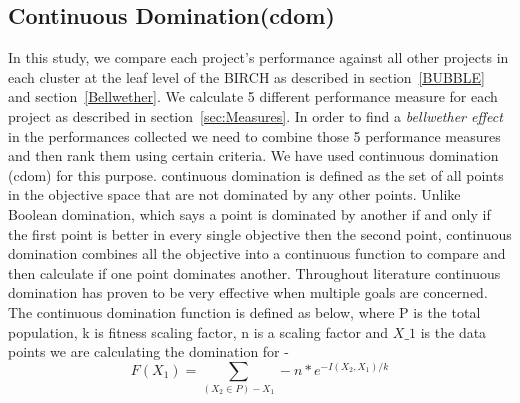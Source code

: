 \documentclass[10pt,journal,compsoc]{IEEEtran}
\begin{document}
\subsection{Continuous Domination(cdom)}
\label{cdom}
In this study, we compare each project's performance against all other projects in each cluster at the leaf level of the BIRCH as described in section~\ref{BUBBLE} and section~\ref{Bellwether}. We calculate 5 different performance measure for each project as described in section~\ref{sec:Measures}. In order to find a \textit{bellwether effect} in the performances collected we need to combine those 5 performance measures and then rank them using certain criteria. We have used continuous domination (cdom) for this purpose. continuous domination is defined as the set of all points in the objective space that are not dominated by any other points. Unlike Boolean domination, which says a point is dominated by another if and only if the first point is better in every single objective then the second point, continuous domination combines all the objective into a continuous function to compare and then calculate if one point dominates another. Throughout literature continuous domination has proven to be very effective when multiple goals are concerned. The continuous domination function is defined as below, where P is the total population, k is fitness scaling factor, n is a scaling factor and $X\_1$ is the data points we are calculating the domination for - 
\begin{equation}
    F(X_1) = \sum_{{(X_2\in P) - X_1}} -n*e^{-I(X_2,X_1)/k}
\end{equation}
\end{document}
